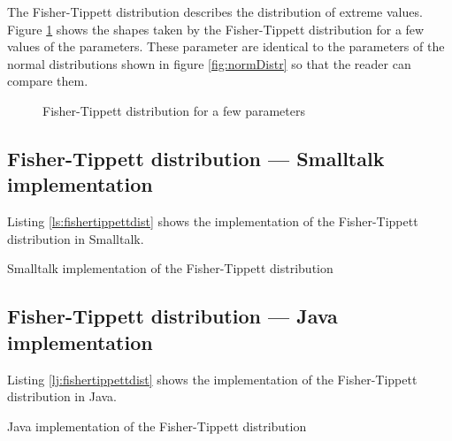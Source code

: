\documentclass[twoside]{book}
\begin{document}
The Fisher-Tippett distribution describes the distribution of
extreme values. Figure \ref{fig:ftippettDistr} shows the shapes
taken by the Fisher-Tippett distribution for a few values of the
parameters. These parameter are identical to the parameters of the
normal distributions shown in figure \ref{fig:normDistr} so that
the reader can compare them.
\begin{figure}
\center{} \caption{Fisher-Tippett distribution for a few
parameters}\label{fig:ftippettDistr}
\end{figure}

\subsection{Fisher-Tippett distribution --- Smalltalk  implementation}
Listing \ref{ls:fishertippettdist} shows the implementation of the
Fisher-Tippett distribution in Smalltalk.

\begin{listing} Smalltalk implementation of the Fisher-Tippett distribution \label{ls:fishertippettdist}

\end{listing}

\subsection{Fisher-Tippett distribution --- Java  implementation}
Listing \ref{lj:fishertippettdist} shows the implementation of the
Fisher-Tippett distribution in Java.

\begin{listing} Java implementation of the Fisher-Tippett distribution \label{lj:fishertippettdist}

\end{listing}
\end{document}
